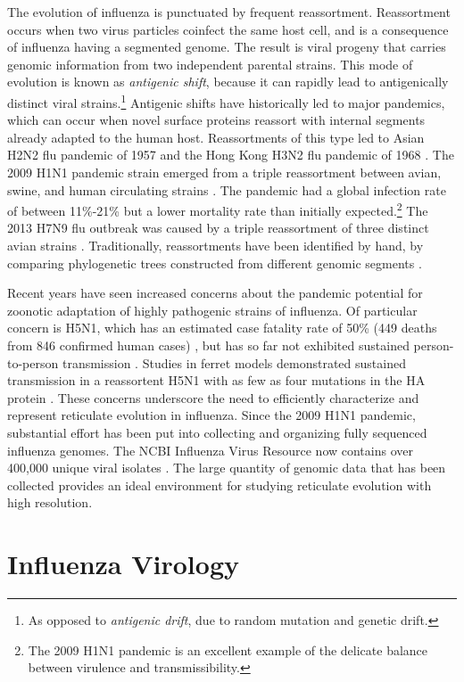 The evolution of influenza is punctuated by frequent reassortment.
Reassortment occurs when two virus particles coinfect the same host cell, and is a consequence of influenza having a segmented genome.
The result is viral progeny that carries genomic information from two independent parental strains.
This mode of evolution is known as \emph{antigenic shift}, because it can rapidly lead to antigenically distinct viral strains.\footnote{As opposed to \emph{antigenic drift}, due to random mutation and genetic drift.}
Antigenic shifts have historically led to major pandemics, which can occur when novel surface proteins reassort with internal segments already adapted to the human host.
Reassortments of this type led to Asian H2N2 flu pandemic of 1957 and the Hong Kong H3N2 flu pandemic of 1968 \cite{Lindstrom:2004il}.
The 2009 H1N1 pandemic strain emerged from a triple reassortment between avian, swine, and human circulating strains \cite{Hernandez:2011ud,Smith:2009io}.
The pandemic had a global infection rate of between 11\%-21\% but a lower mortality rate than initially expected.\footnote{The 2009 H1N1 pandemic is an excellent example of the delicate balance between virulence and transmissibility.}
The 2013 H7N9 flu outbreak was caused by a triple reassortment of three distinct avian strains \cite{Chen:2013kp}.
Traditionally, reassortments have been identified by hand, by comparing phylogenetic trees constructed from different genomic segments \cite{Nelson:2006bx}.

Recent years have seen increased concerns about the pandemic potential for zoonotic adaptation of highly pathogenic strains of influenza.
Of particular concern is H5N1, which has an estimated case fatality rate of 50\% (449 deaths from 846 confirmed human cases) \cite{WHO:2016a}, but has so far not exhibited sustained person-to-person transmission \cite{WHO:2014b}.
Studies in ferret models demonstrated sustained transmission in a reassortent H5N1 with as few as four mutations in the HA protein \cite{Imai:2012hn}.
These concerns underscore the need to efficiently characterize and represent reticulate evolution in influenza.
Since the 2009 H1N1 pandemic, substantial effort has been put into collecting and organizing fully sequenced influenza genomes.
The NCBI Influenza Virus Resource now contains over 400,000 unique viral isolates \cite{Bao:2008cq}.
The large quantity of genomic data that has been collected provides an ideal environment for studying reticulate evolution with high resolution.

\section{Influenza Virology}
\label{flu:virology}

